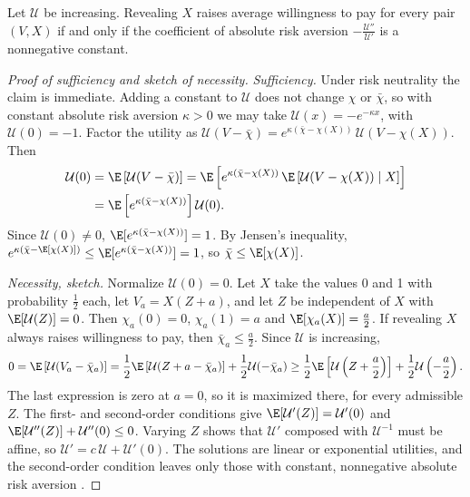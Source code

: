\begin{proposition}\label{prop:14-mw-cara}
Let $\mathcal U$ be increasing. Revealing $X$ raises average willingness to pay for every pair $(V,X)$ if and
only if the coefficient of absolute risk aversion $-\frac{\mathcal U''}{\mathcal U'}$ is a nonnegative
constant.
\end{proposition}

\begin{proof}[Proof of sufficiency and sketch of necessity]
\emph{Sufficiency.} Under risk neutrality the claim is immediate. Adding a constant to $\mathcal U$ does not change
$\chi$ or $\bar\chi$, so with constant absolute risk aversion $\kappa>0$ we may take
$\mathcal U(x)=-e^{-\kappa x}$, with $\mathcal U(0)=-1$. Factor the utility as
$\mathcal U(V-\bar\chi)=e^{\kappa(\bar\chi-\chi(X))}\,\mathcal U(V-\chi(X))$. Then
\begin{align*}
  \mathcal U(0)&=\E\left[\mathcal U(V-\bar\chi)\right]
  =\E\left[e^{\kappa(\bar\chi-\chi(X))}\,\E\left[\mathcal U(V-\chi(X))\mid X\right]\right]\\
  &=\E\left[e^{\kappa(\bar\chi-\chi(X))}\right]\mathcal U(0).
\end{align*}
Since $\mathcal U(0)\ne0$, $\E[e^{\kappa(\bar\chi-\chi(X))}]=1$. By Jensen's inequality,
$e^{\kappa(\bar\chi-\E[\chi(X)])}\le\E[e^{\kappa(\bar\chi-\chi(X))}]=1$, so $\bar\chi\le\E[\chi(X)]$.

\emph{Necessity, sketch.} Normalize $\mathcal U(0)=0$. Let $X$ take the values 0 and 1 with probability
$\frac{1}{2}$ each, let $V_a=X(Z+a)$, and let $Z$ be independent of $X$ with $\E[\mathcal U(Z)]=0$. Then
$\chi_a(0)=0$, $\chi_a(1)=a$ and $\E[\chi_a(X)]=\frac{a}{2}$. If revealing $X$ always raises willingness to pay,
then $\bar\chi_a\le\frac{a}{2}$. Since $\mathcal U$ is increasing,
\begin{equation*}
  0=\E\left[\mathcal U(V_a-\bar\chi_a)\right]=\frac{1}{2}\E\left[\mathcal U(Z+a-\bar\chi_a)\right]
  +\frac{1}{2}\mathcal U(-\bar\chi_a)
  \ge\frac{1}{2}\E\left[\mathcal U\left(Z+\frac{a}{2}\right)\right]+\frac{1}{2}\mathcal U\left(-\frac{a}{2}\right).
\end{equation*}
The last expression is zero at $a=0$, so it is maximized there, for every admissible $Z$. The first- and
second-order conditions give $\E[\mathcal U'(Z)]=\mathcal U'(0)$ and $\E[\mathcal U''(Z)]+\mathcal U''(0)\le0$.
Varying $Z$ shows that $\mathcal U'$ composed with $\mathcal U^{-1}$ must be affine, so
$\mathcal U'=c\,\mathcal U+\mathcal U'(0)$. The solutions are linear or exponential utilities, and the
second-order condition leaves only those with constant, nonnegative absolute risk aversion
\citep[pp.~1115--1116]{MilgromWeber1982}.
\end{proof}

